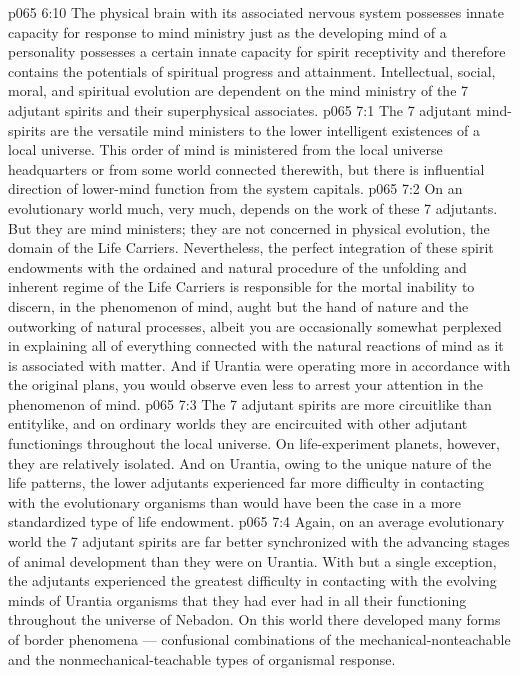 \vs p065 6:10 The physical brain with its associated nervous system possesses innate capacity for response to mind ministry just as the developing mind of a personality possesses a certain innate capacity for spirit receptivity and therefore contains the potentials of spiritual progress and attainment. Intellectual, social, moral, and spiritual evolution are dependent on the mind ministry of the 7 adjutant spirits and their superphysical associates.
\vs p065 7:1 The 7 adjutant mind\hyp{}spirits are the versatile mind ministers to the lower intelligent existences of a local universe. This order of mind is ministered from the local universe headquarters or from some world connected therewith, but there is influential direction of lower\hyp{}mind function from the system capitals.
\vs p065 7:2 On an evolutionary world much, very much, depends on the work of these 7 adjutants. But they are mind ministers; they are not concerned in physical evolution, the domain of the Life Carriers. Nevertheless, the perfect integration of these spirit endowments with the ordained and natural procedure of the unfolding and inherent regime of the Life Carriers is responsible for the mortal inability to discern, in the phenomenon of mind, aught but the hand of nature and the outworking of natural processes, albeit you are occasionally somewhat perplexed in explaining all of everything connected with the natural reactions of mind as it is associated with matter. And if Urantia were operating more in accordance with the original plans, you would observe even less to arrest your attention in the phenomenon of mind.
\vs p065 7:3 The 7 adjutant spirits are more circuitlike than entitylike, and on ordinary worlds they are encircuited with other adjutant functionings throughout the local universe. On life\hyp{}experiment planets, however, they are relatively isolated. And on Urantia, owing to the unique nature of the life patterns, the lower adjutants experienced far more difficulty in contacting with the evolutionary organisms than would have been the case in a more standardized type of life endowment.
\vs p065 7:4 Again, on an average evolutionary world the 7 adjutant spirits are far better synchronized with the advancing stages of animal development than they were on Urantia. With but a single exception, the adjutants experienced the greatest difficulty in contacting with the evolving minds of Urantia organisms that they had ever had in all their functioning throughout the universe of Nebadon. On this world there developed many forms of border phenomena --- confusional combinations of the mechanical\hyp{}nonteachable and the nonmechanical\hyp{}teachable types of organismal response.
